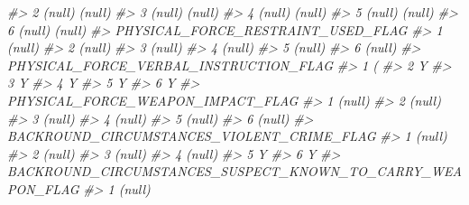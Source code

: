 \documentclass[
]{krantz}
\makeatletter
\newenvironment{Shaded}{\begin{snugshade}}{\end{snugshade}}
\newcommand{\CommentTok}[1]{\textcolor[rgb]{0.37,0.37,0.37}{\textit{#1}}}
\newenvironment{kframe}{%
\medskip{}
\setlength{\fboxsep}{.8em}
 \def\at@end@of@kframe{}%
 \ifinner\ifhmode%
  \def\at@end@of@kframe{\end{minipage}}%
  \begin{minipage}{\columnwidth}%
 \fi\fi%
 \def\FrameCommand##1{\hskip\@totalleftmargin \hskip-\fboxsep
 \colorbox{shadecolor}{##1}\hskip-\fboxsep
     \hskip-\linewidth \hskip-\@totalleftmargin \hskip\columnwidth}%
 \MakeFramed {\advance\hsize-\width
   \@totalleftmargin\z@ \linewidth\hsize
   \@setminipage}}%
 {\par\unskip\endMakeFramed%
 \at@end@of@kframe}
\renewenvironment{Shaded}{\begin{kframe}}{\end{kframe}}
\makeatother
\begin{document}
\begin{Shaded}
\begin{Highlighting}[]
\CommentTok{\#\textgreater{} 2                            (null)                    (null)}
\CommentTok{\#\textgreater{} 3                            (null)                    (null)}
\CommentTok{\#\textgreater{} 4                            (null)                    (null)}
\CommentTok{\#\textgreater{} 5                            (null)                    (null)}
\CommentTok{\#\textgreater{} 6                            (null)                    (null)}
\CommentTok{\#\textgreater{}   PHYSICAL\_FORCE\_RESTRAINT\_USED\_FLAG}
\CommentTok{\#\textgreater{} 1                             (null)}
\CommentTok{\#\textgreater{} 2                             (null)}
\CommentTok{\#\textgreater{} 3                             (null)}
\CommentTok{\#\textgreater{} 4                             (null)}
\CommentTok{\#\textgreater{} 5                             (null)}
\CommentTok{\#\textgreater{} 6                             (null)}
\CommentTok{\#\textgreater{}   PHYSICAL\_FORCE\_VERBAL\_INSTRUCTION\_FLAG}
\CommentTok{\#\textgreater{} 1                                      (}
\CommentTok{\#\textgreater{} 2                                      Y}
\CommentTok{\#\textgreater{} 3                                      Y}
\CommentTok{\#\textgreater{} 4                                      Y}
\CommentTok{\#\textgreater{} 5                                      Y}
\CommentTok{\#\textgreater{} 6                                      Y}
\CommentTok{\#\textgreater{}   PHYSICAL\_FORCE\_WEAPON\_IMPACT\_FLAG}
\CommentTok{\#\textgreater{} 1                            (null)}
\CommentTok{\#\textgreater{} 2                            (null)}
\CommentTok{\#\textgreater{} 3                            (null)}
\CommentTok{\#\textgreater{} 4                            (null)}
\CommentTok{\#\textgreater{} 5                            (null)}
\CommentTok{\#\textgreater{} 6                            (null)}
\CommentTok{\#\textgreater{}   BACKROUND\_CIRCUMSTANCES\_VIOLENT\_CRIME\_FLAG}
\CommentTok{\#\textgreater{} 1                                     (null)}
\CommentTok{\#\textgreater{} 2                                     (null)}
\CommentTok{\#\textgreater{} 3                                     (null)}
\CommentTok{\#\textgreater{} 4                                     (null)}
\CommentTok{\#\textgreater{} 5                                          Y}
\CommentTok{\#\textgreater{} 6                                          Y}
\CommentTok{\#\textgreater{}   BACKROUND\_CIRCUMSTANCES\_SUSPECT\_KNOWN\_TO\_CARRY\_WEAPON\_FLAG}
\CommentTok{\#\textgreater{} 1                                                     (null)}

\end{Highlighting}
\end{Shaded}
\end{document}
